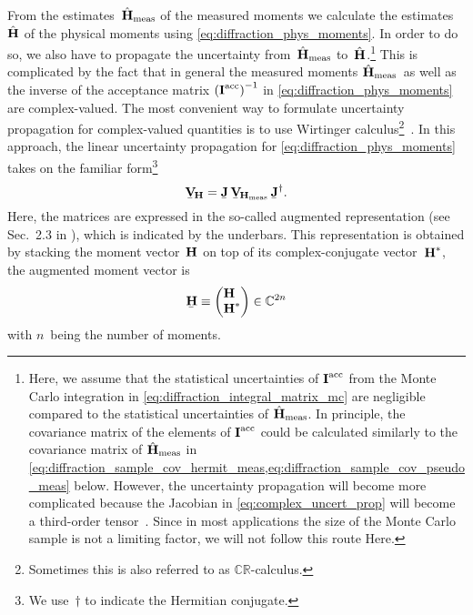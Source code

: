 From the estimates~$\hat{\bm{\mathrm{H}}}_\text{meas}$ of the measured
moments we calculate the estimates~$\hat{\bm{\mathrm{H}}}$ of the physical
moments using \cref{eq:diffraction_phys_moments}.  In order to do so,
we also have to propagate the uncertainty
from~$\hat{\bm{\mathrm{H}}}_\text{meas}$ to~$\hat{\bm{\mathrm{H}}}$.\footnote{%
Here, we assume that the statistical uncertainties of $\bm{\mathrm{I}}^\text{acc}$
from the Monte Carlo integration in
\cref{eq:diffraction_integral_matrix_mc} are negligible compared to the
statistical uncertainties of $\hat{\bm{\mathrm{H}}}_\text{meas}$.  In
principle, the covariance matrix of the elements of
$\bm{\mathrm{I}}^\text{acc}$ could be calculated similarly to the
covariance matrix of $\hat{\bm{\mathrm{H}}}_\text{meas}$ in
\cref{eq:diffraction_sample_cov_hermit_meas,eq:diffraction_sample_cov_pseudo_meas}
below.  However, the uncertainty propagation will become more
complicated because the Jacobian in \cref{eq:complex_uncert_prop} will
become a third-order
tensor~\cite{Laue:2018,Laue:2020,matrixcalculus,Sourya:2019,maxtrixcookbook:2012,wikipedia:MatrixCalculus}.
Since in most applications the size of the Monte Carlo sample is not a
limiting factor, we will not follow this route Here.}  This is
complicated by the fact that in general the measured moments
$\hat{\bm{\mathrm{H}}}_\text{meas}$~as well as the inverse of the acceptance
matrix $\rBrk[0]{\mat{I}^\text{acc}}^{-1}$ in
\cref{eq:diffraction_phys_moments} are complex-valued.  The most
convenient way to formulate uncertainty propagation for complex-valued
quantities is to use Wirtinger calculus\footnote{Sometimes this is
also referred to as
$\mathbb{C}\mathbb{R}$-calculus.}~\cite{wikipedia:WirtingerCalculus,Wirtinger:1927,Kreutz-Delgado:2009,Grube:2023}.
In this approach, the linear uncertainty propagation for
\cref{eq:diffraction_phys_moments} takes on the familiar
form\footnote{We use~$\dagger$ to indicate the Hermitian conjugate.}
\begin{equation}
  \label{eq:complex_uncert_prop}
  \underaccent{\bar}{\covMatSym}_{\!\vect{H}}
  = \underaccent{\bar}{\mat{J}}\, \underaccent{\bar}{\covMatSym}_{\!\vect{H}_\text{meas}}\, \underaccent{\bar}{\mat{J}}^\dagger.
\end{equation}
Here, the matrices are expressed in the so-called augmented
representation (see \eg Sec.~2.3 in ), which is
indicated by the underbars.  This representation is obtained by
stacking the moment vector~$\bm{\mathrm{H}}$ on top of its
complex-conjugate vector~$\bm{\mathrm{H}}^*$, \ie the augmented moment
vector is
\begin{equation}
  \underaccent{\bar}{\vect{H}}
  \equiv \begin{pmatrix*}[l]
    \vect{H} \\
    \vect{H}^*
  \end{pmatrix*}
  \in \mathbb{C}^{2n}
\end{equation}
with $n$~being the number of moments.

